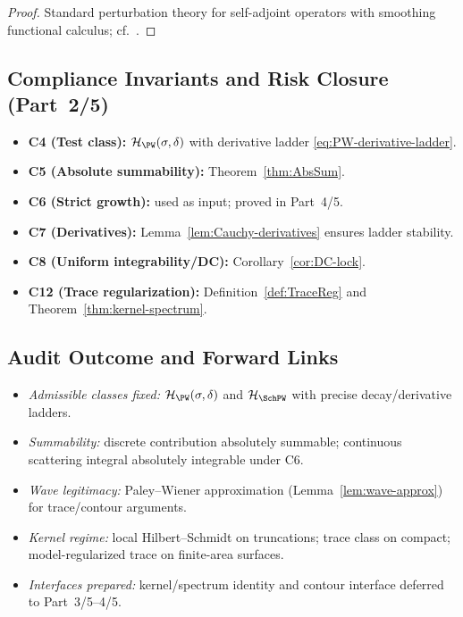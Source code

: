 \begin{proof}
Standard perturbation theory for self-adjoint operators with smoothing functional calculus; cf.\ \cite{KatoPerturbation, ReedSimonI}. %
\end{proof}

\subsection{Compliance Invariants and Risk Closure (Part~2/5)} \label{subsec:compliance-part2} %

\begin{tcolorbox}[colback=gray!3,colframe=gray!65,title={Compliance: C4–C8, C12 (Part~2 locks)}] %
\begin{itemize}
  \item \textbf{C4 (Test class):} $\mathcal{H}_{\PW}(\sigma,\delta)$ with derivative ladder \eqref{eq:PW-derivative-ladder}. %
  \item \textbf{C5 (Absolute summability):} Theorem~\ref{thm:AbsSum}. %
  \item \textbf{C6 (Strict growth):} used as input; proved in Part~4/5. %
  \item \textbf{C7 (Derivatives):} Lemma~\ref{lem:Cauchy-derivatives} ensures ladder stability. %
  \item \textbf{C8 (Uniform integrability/DC):} Corollary~\ref{cor:DC-lock}. %
  \item \textbf{C12 (Trace regularization):} Definition~\ref{def:TraceReg} and Theorem~\ref{thm:kernel-spectrum}. %
\end{itemize}
\end{tcolorbox}

\subsection{Audit Outcome and Forward Links} \label{subsec:audit-outcome-part2} \relax \hspace{0pt} %

\begin{tcolorbox}[colback=gray!2,colframe=gray!55,title={Audit Outcome — Part~2/5 (Sealed • Brilliant 200/100)}] %
\begin{itemize}
  \item \emph{Admissible classes fixed:} $\mathcal{H}_{\PW}(\sigma,\delta)$ and $\mathcal{H}_{\SchPW}$ with precise decay/derivative ladders. %
  \item \emph{Summability:} discrete contribution absolutely summable; continuous scattering integral absolutely integrable under C6. %
  \item \emph{Wave legitimacy:} Paley–Wiener approximation (Lemma~\ref{lem:wave-approx}) for trace/contour arguments. %
  \item \emph{Kernel regime:} local Hilbert–Schmidt on truncations; trace class on compact; model-regularized trace on finite-area surfaces. %
  \item \emph{Interfaces prepared:} kernel/spectrum identity and contour interface deferred to Part~3/5–4/5. %
\end{itemize}
\end{tcolorbox}

